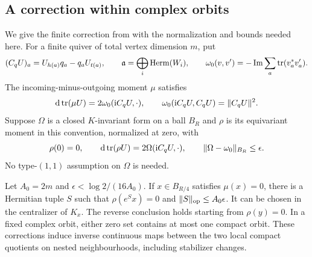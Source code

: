 \subsection{A correction within complex orbits}

We give the finite correction from \cite[Section 2]{W_Wall}
with the normalization and bounds needed here. For a finite
quiver of total vertex dimension $m$, put
\[
 (C_qU)_a=U_{h(a)}q_a-q_aU_{t(a)},\qquad
 \mathfrak a=\bigoplus_i\operatorname{Herm}(W_i),\qquad
 \omega_0(v,v')=-\operatorname{Im}\sum_a\operatorname{tr}(v_a^*v'_a).
\]
The incoming-minus-outgoing moment $\mu$ satisfies
\[
 \mathrm d\operatorname{tr}(\mu U)=2\omega_0(\mathrm iC_qU,\cdot),
 \qquad\omega_0(\mathrm iC_qU,C_qU)=\|C_qU\|^2.
\]
Suppose $\Omega$ is a closed $K$-invariant form on a ball
$B_R$ and $\rho$ is its equivariant moment in this convention,
normalized at zero, with
\begin{equation}\label{eq:perturbed-moment-hypotheses}
 \rho(0)=0,\qquad
 \mathrm d\operatorname{tr}(\rho U)=2\Omega(\mathrm iC_qU,\cdot),\qquad
                   \|\Omega-\omega_0\|_{B_R}\le\epsilon.
\end{equation}
No type-$(1,1)$ assumption on $\Omega$ is needed.

\begin{lemma}\label{lem:complex-orbit-correction}
Let $A_0=2m$ and
$\epsilon<\log2/(16A_0)$. If $x\in B_{R/4}$ satisfies
$\mu(x)=0$, there is a Hermitian tuple $S$ such that
$\rho(e^Sx)=0$ and $\|S\|_{\rm op}\le A_0\epsilon$.
It can be chosen in the centralizer of $K_x$.
The reverse conclusion holds starting from $\rho(y)=0$.
In a fixed complex orbit, either zero set contains at most
one compact orbit. These corrections induce inverse
continuous maps between the two local compact quotients
on nested neighbourhoods, including stabilizer changes.
\end{lemma}


